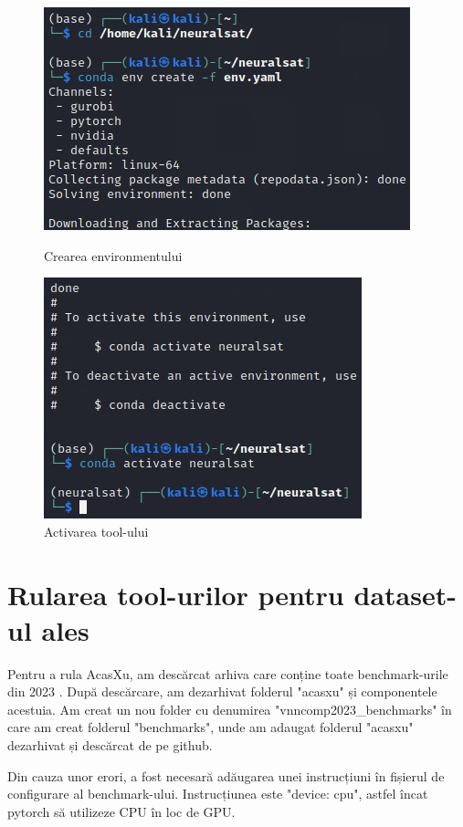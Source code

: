 \documentclass[12pt,a4paper]{article}
\theoremstyle{definition}
\theoremstyle{remark}
\begin{document}
\begin{figure}[!htb]
   \begin{minipage}{0.48\textwidth}
     \centering
     \includegraphics[width=.95\linewidth]{neuralsat_env.jpg}
     \caption{Crearea environmentului}\label{Fig:Data1}
   \end{minipage}\hfill
   \begin{minipage}{0.48\textwidth}
     \centering
     \includegraphics[width=.9\linewidth]{neuralsat_activate.jpg}
     \caption{Activarea tool-ului}\label{Fig:Data2}
   \end{minipage}
\end{figure}

\section{Rularea tool-urilor pentru dataset-ul ales}
Pentru a rula AcasXu, am descărcat arhiva care conține toate benchmark-urile din 2023 \cite{git4}. După descărcare, am dezarhivat folderul "acasxu" și componentele acestuia. Am creat un nou folder cu denumirea "vnncomp2023\_benchmarks" în care am creat folderul "benchmarks", unde am adaugat folderul "acasxu" dezarhivat și descărcat de pe github.  \par
Din cauza unor erori, a fost necesară adăugarea unei instrucțiuni în fișierul de configurare al benchmark-ului. Instrucțiunea este "device: cpu", astfel încat pytorch să utilizeze CPU în loc de GPU. \par
\end{document}
